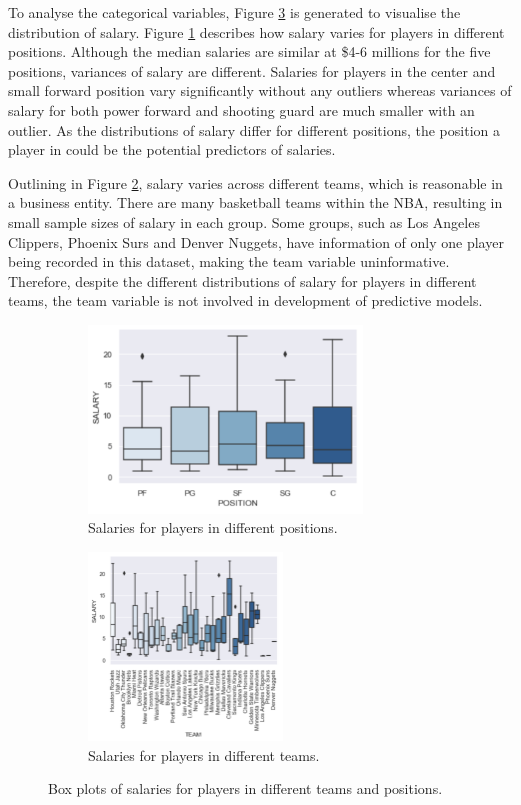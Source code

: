 \documentclass[letterpaper,12pt,twoside,]{pinp}
\begin{document}
To analyse the categorical variables, Figure \ref{fig:boxes} is
generated to visualise the distribution of salary. Figure
\ref{fig:position} describes how salary varies for players in different
positions. Although the median salaries are similar at \$4-6 millions
for the five positions, variances of salary are different. Salaries for
players in the center and small forward position vary significantly
without any outliers whereas variances of salary for both power forward
and shooting guard are much smaller with an outlier. As the
distributions of salary differ for different positions, the position a
player in could be the potential predictors of salaries.

Outlining in Figure \ref{fig:team}, salary varies across different
teams, which is reasonable in a business entity. There are many
basketball teams within the NBA, resulting in small sample sizes of
salary in each group. Some groups, such as Los Angeles Clippers, Phoenix
Surs and Denver Nuggets, have information of only one player being
recorded in this dataset, making the team variable uninformative.
Therefore, despite the different distributions of salary for players in
different teams, the team variable is not involved in development of
predictive models.

\begin{figure}[H]
\begin{subfigure}{0.5\textwidth}
\includegraphics[width=0.9\linewidth, height=5cm]{position_box.png}
\centering
\caption{Salaries for players in different positions.}
\label{fig:position}
\end{subfigure}
\begin{subfigure}{0.5\textwidth}
\includegraphics[width=0.9\linewidth, height=5cm]{team_box.png}
\centering
\caption{Salaries for players in different teams.}
\label{fig:team}
\end{subfigure}
\caption{Box plots of salaries for players in different teams and positions.}
\label{fig:boxes}
\end{figure}
\end{document}

